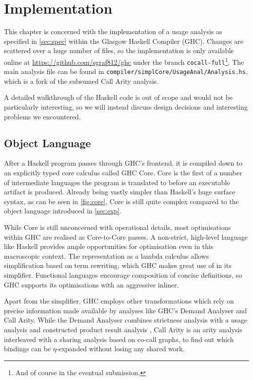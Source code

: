 \chapter{Implementation}\label{sec:impl}

This chapter is concerned with the implementation of a usage analysis as specified in \cref{sec:spec} within the Glasgow Haskell Compiler (GHC).
Changes are scattered over a huge number of files, so the implementation is only available online at \url{https://github.com/sgraf812/ghc} under the branch \texttt{cocall-full}\footnote{And of course in the eventual submission.}.
The main analysis file can be found in \texttt{compiler/simplCore/UsageAnal/Analysis.hs}, which is a fork of the subsumed Call Arity analysis.

A detailed walkthrough of the Haskell code is out of scope and would not be particularly interesting, so we will instead discuss design decisions and interesting problems we encountered.

\section{Object Language}

After a Haskell program passes through GHC's frontend, it is compiled down to an explicitly typed core calculus called GHC Core. 
Core is the first of a number of intermediate languages the program is translated to before an executable artifact is produced.
Already being vastly simpler than Haskell's huge surface syntax, as can be seen in \cref{fig:core}, Core is still quite complex compared to the object language introduced in \cref{sec:exp}.

While Core is still unconcerned with operational details, most optimisations within GHC are realised as Core-to-Core passes.
A non-strict, high-level language like Haskell provides ample opportunities for optimisation even in this macroscopic context.
The representation as a lambda calculus allows simplification based on term rewriting, which GHC makes great use of in its simplifier.
Functional languages encourage composition of concise definitions, so GHC supports its optimisations with an aggressive inliner.

Apart from the simplifier, GHC employs other transformations which rely on precise information made available by analyses like GHC's Demand Analyser and Call Arity.
While the Demand Analyser combines strictness analysis \parencite{dmd} with a usage analysis \parencite{card} and constructed product result analysis \parencite{cpr}, Call Arity is an arity analysis interleaved with a sharing analysis based on co-call graphs, to find out which bindings can be $\eta$-expanded without losing any shared work.

